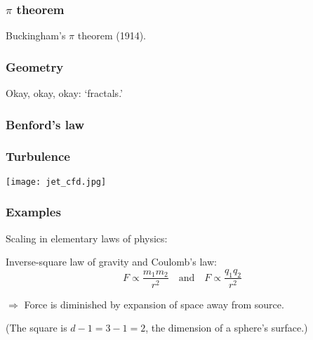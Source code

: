 \begin{frame}
  \frametitle{$\pi$ theorem}

Buckingham's $\pi$ theorem (1914).




\end{frame}

\begin{frame}
  \frametitle{Geometry}

Okay, okay, okay: `fractals.'


\end{frame}

\begin{frame}
  \frametitle{Benford's law}

\end{frame}

\begin{frame}
  \frametitle{Turbulence}


\texttt{[image: jet\_cfd.jpg]}


\end{frame}

\begin{frame}
  \frametitle{Examples}

Scaling in elementary laws of physics:

Inverse-square law of gravity
and Coulomb's law: 
$$F \propto \frac{m_1 m_2}{r^{2}}
\quad \mbox{and} \quad
F \propto \frac{q_1 q_2}{r^{2}}$$

$\Rightarrow$ Force is diminished by expansion of
space away from source.  

(The square is $d-1=3-1=2$, the dimension of
a sphere's surface.)







\end{frame}

